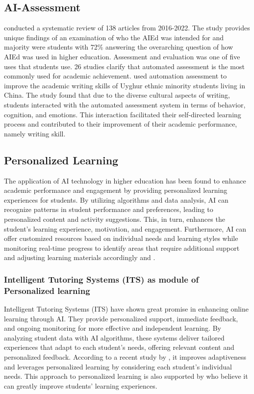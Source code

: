\subsection{AI-Assessment}
\citep{crompton_artificial_2023} conducted a systematic review of 138 articles from 2016-2022. 
The study provides unique findings of an examination of who the AIEd 
was intended for and majority were students with 72\% 
answering the overarching question of how AIEd was used in higher education. 
Assessment and evaluation was one of five uses that students use. 26 studies 
clarify that automated assessment is the most commonly used for academic achievement. 
\citep{zhang_student_2022} used automation assessment to improve the 
academic writing skills of Uyghur ethnic minority students living in China. 
The study found that due to the diverse cultural aspects of writing, 
students interacted with the automated assessment system in terms of 
behavior, cognition, and emotions. This interaction facilitated their 
self-directed learning process and contributed to their improvement of their 
academic performance, namely writing skill.

\subsection{Personalized Learning}
The application of AI technology in higher education has been found to enhance academic performance
and engagement by providing personalized learning experiences for students. By utilizing algorithms
and data analysis, AI can recognize patterns in student performance and preferences, leading to personalized
content and activity suggestions. This, in turn, enhances the student’s learning experience, motivation, and
engagement. Furthermore, AI can offer customized resources based on individual needs and learning styles while
monitoring real-time progress to identify areas that require additional support and adjusting learning materials
accordingly \citep{guerrero-quinonez_artificial_2023} and \citep{l_d_of_cs_akshara_first_grade_college_2023}.

\subsubsection{Intelligent Tutoring Systems (ITS) as module of Personalized learning}

Intelligent Tutoring Systems (ITS) have shown great promise in enhancing online learning through  AI.
They provide personalized support, immediate feedback, and ongoing monitoring for more effective and independent learning.
By analyzing student data with AI algorithms, these systems deliver tailored experiences that adapt to each student's needs,
offering relevant content and personalized feedback. According to a recent study by \citep{l_d_of_cs_akshara_first_grade_college_2023},
it improves adaptiveness and leverages personalized learning by considering each student's individual needs.
This approach to personalized learning is also supported by \citep{bradac_design_2022} who believe it can greatly
improve students' learning experiences.

